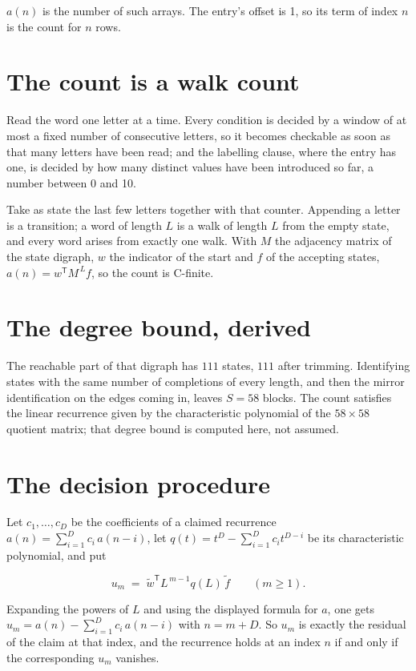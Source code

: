 \documentclass[11pt]{article}
\theoremstyle{definition}
\begin{document}
$a(n)$ is the number of such arrays. The entry's offset is 1, so its term of index $n$ is the count for $n$ rows.

\section{The count is a walk count}

Read the word one letter at a time. Every condition is decided by a window of at most a fixed number of consecutive letters, so it becomes checkable as soon as that many letters have been read; and the labelling clause, where the entry has one, is decided by how many distinct values have been introduced so far, a number between $0$ and 10.

Take as state the last few letters together with that counter. Appending a letter is a transition; a word of length $L$ is a walk of length $L$ from the empty state, and every word arises from exactly one walk. With $M$ the adjacency matrix of the state digraph, $w$ the indicator of the start and $f$ of the accepting states, $a(n) = w^{\mathsf T}M^{\,L}f$, so the count is C-finite.

\section{The degree bound, derived}

The reachable part of that digraph has $111$ states, $111$ after trimming. Identifying states with the same number of completions of every length, and then the mirror identification on the edges coming in, leaves $S = 58$ blocks. The count satisfies the linear recurrence given by the characteristic polynomial of the $58\times58$ quotient matrix; that degree bound is computed here, not assumed.

\section{The decision procedure}

Let $c_1,\dots,c_D$ be the coefficients of a claimed recurrence $a(n) = \sum_{i=1}^{D} c_i\,a(n-i)$, let $q(t) = t^{D} - \sum_{i=1}^{D} c_i t^{D-i}$ be its characteristic polynomial, and put

\[u_m \;=\; \tilde w^{\mathsf T} L^{\,m-1} q(L)\,\tilde f \qquad (m \ge 1).\]

Expanding the powers of $L$ and using the displayed formula for $a$, one gets $u_m = a(n) - \sum_{i=1}^{D} c_i\,a(n-i)$ with $n = m + D$. So $u_m$ is exactly the residual of the claim at that index, and the recurrence holds at an index $n$ if and only if the corresponding $u_m$ vanishes.
\end{document}
